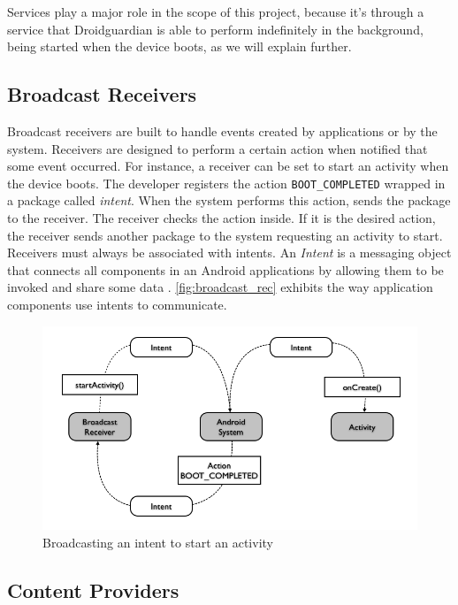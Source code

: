 Services play a major role in the scope of this project, because it's through a service that Droidguardian is able to perform indefinitely in the background, being started when the device boots, as we will explain further.

\subsection{Broadcast Receivers}

Broadcast receivers are built to handle events created by applications or by the system. Receivers are designed to perform a certain action when notified that some event occurred. For instance, a receiver can be set to start an activity when the device boots. The developer registers the action \texttt{BOOT\_COMPLETED} wrapped in a package called \textit{intent}. When the system performs this action, sends the package to the receiver. The receiver checks the action inside. If it is the desired action, the receiver sends another package to the system requesting an activity to start. Receivers must always be associated with intents. An \textit{Intent} is a messaging object that connects all components in an Android applications by allowing them to be invoked and share some data \cite{Intents:Android}. \autoref{fig:broadcast_rec} exhibits the way application components use intents to communicate.

\begin{figure}[h]
 \begin{center}
 \includegraphics[scale=0.5]{figures/broadcast_receiver.png}
 \end{center}
 \caption{Broadcasting an intent to start an activity}
 \label{fig:broadcast_rec}
\end{figure}


\subsection{Content Providers}

